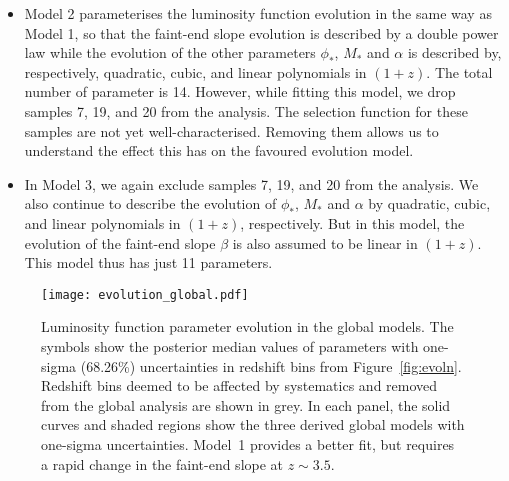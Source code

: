 \documentclass[fleqn,usenatbib]{mnras}
\begin{document}
\begin{itemize}
\item Model 2 parameterises the luminosity function evolution in the
  same way as Model 1, so that the faint-end slope evolution is
  described by a double power law while the evolution of the other
  parameters $\phi_*$, $M_*$ and $\alpha$ is described by,
  respectively, quadratic, cubic, and linear polynomials in $(1+z)$.
  The total number of parameter is 14.  However, while fitting this
  model, we drop samples 7, 19, and 20 from the analysis.  The
  selection function for these samples are not yet well-characterised.
  Removing them allows us to understand the effect this has on the
  favoured evolution model.

\item In Model 3, we again exclude samples 7, 19, and 20 from the
  analysis.  We also continue to describe the evolution of $\phi_*$,
  $M_*$ and $\alpha$ by quadratic, cubic, and linear polynomials in
  $(1+z)$, respectively.  But in this model, the evolution of the
  faint-end slope $\beta$ is also assumed to be linear in $(1+z)$.
  This model thus has just 11 parameters.
\end{itemize}


\begin{figure*}
  \begin{center}
    \texttt{[image: evolution\_global.pdf]}
  \end{center}
  \caption{Luminosity function parameter evolution in the global
    models.  The symbols show the posterior median values of
    parameters with one-sigma (68.26\%) uncertainties in redshift bins
    from Figure~\ref{fig:evoln}.  Redshift bins deemed to be affected
    by systematics and removed from the global analysis are shown in
    grey.  In each panel, the solid curves and shaded regions show the
    three derived global models with one-sigma uncertainties.  Model~1
    provides a better fit, but requires a rapid change in the
    faint-end slope at $z\sim 3.5$.}
  \label{fig:evoln_global}
\end{figure*}
\end{document}
